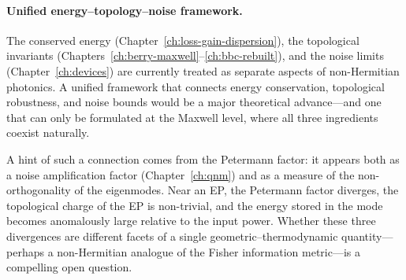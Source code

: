 \paragraph{Unified energy--topology--noise framework.}
The conserved energy (Chapter~\ref{ch:loss-gain-dispersion}), the
topological invariants (Chapters~\ref{ch:berry-maxwell}--\ref{ch:bbc-rebuilt}),
and the noise limits (Chapter~\ref{ch:devices}) are currently treated as
separate aspects of non-Hermitian photonics. A unified framework that
connects energy conservation, topological robustness, and noise bounds
would be a major theoretical advance---and one that can
only be formulated at the Maxwell level, where all three ingredients
coexist naturally.

A hint of such a connection comes from the Petermann factor: it appears
both as a noise amplification factor (Chapter~\ref{ch:qnm}) and as a
measure of the non-orthogonality of the eigenmodes. Near an EP, the
Petermann factor diverges, the topological charge of the EP is
non-trivial, and the energy stored in the mode becomes anomalously
large relative to the input power. Whether these three divergences are
different facets of a single geometric--thermodynamic quantity---perhaps
a non-Hermitian analogue of the Fisher information metric---is a
compelling open question.

